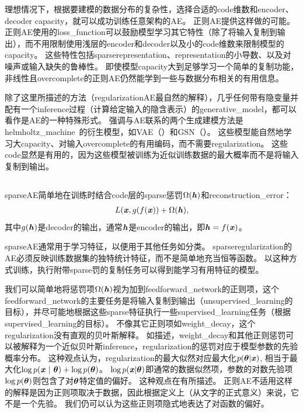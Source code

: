 理想情况下，根据要建模的数据分布的复杂性，选择合适的\gls{code}维数和\gls{encoder}、\gls{decoder}
\gls{capacity}，就可以成功训练任意架构的\gls{AE}。
正则\gls{AE}提供这样做的可能。
正则\gls{AE}使用的\gls{loss_function}可以鼓励模型学习其它特性（除了将输入复制到输出），而不用限制使用浅层的\gls{encoder}和\gls{decoder}以及小的\gls{code}维数来限制模型的\gls{capacity}。
这些特性包括\gls{sparse}\gls{representation}、\gls{representation}的小导数、以及对噪声或输入缺失的鲁棒性。
即使模型\gls{capacity}大到足够学习一个简单的复制功能，非线性且\gls{overcomplete}的正则\gls{AE}仍然能学到一些与数据分布相关的有用信息。


除了这里所描述的方法（\gls{regularization}\gls{AE}最自然的解释），几乎任何带有隐变量并配有一个\gls{inference}过程（计算给定输入的隐含表示）的\gls{generative_model}，都可以看作是\gls{AE}的一种特殊形式。
强调与\gls{AE}联系的两个生成建模方法是\gls{helmholtz_machine}~\citep{Hinton95}的衍生模型，如\gls{VAE}（）和\gls{GSN}（）。
这些模型能自然地学习大\gls{capacity}、对输入\gls{overcomplete}的有用编码，而不需要\gls{regularization}。
这些\gls{code}显然是有用的，因为这些模型被训练为近似训练数据的最大概率而不是将输入复制到输出。


\subsection{}
\label{sec:sparse_autoencoders}
\gls{sparse}\gls{AE}简单地在训练时结合\gls{code}层的\gls{sparse}惩罚$\Omega(\boldsymbol{\mathit{h}})$和\gls{reconstruction_error}：
\begin{align}
L(\boldsymbol{\mathit{x}}, g(f(\boldsymbol{\mathit{x}})) + \Omega(\boldsymbol{\mathit{h}}),
\end{align}
其中$g(\boldsymbol{\mathit{h}})$是\gls{decoder}的输出，通常$\boldsymbol{\mathit{h}}$是\gls{encoder}的输出，即$\boldsymbol{\mathit{h}} = f(\boldsymbol{\mathit{x}})$。


\gls{sparse}\gls{AE}通常用于学习特征，以便用于其他任务如分类。
\gls{sparse}\gls{regularization}的\gls{AE}必须反映训练数据集的独特统计特征，而不是简单地充当恒等函数。
以这种方式训练，执行附带\gls{sparse}罚的复制任务可以得到能学习有用特征的模型。


我们可以简单地将惩罚项$\Omega(\boldsymbol{\mathit{h}})$视为加到\gls{feedforward_network}的正则项，这个\gls{feedforward_network}的主要任务是将输入复制到输出（\gls{unsupervised_learning}的目标），并尽可能地根据这些\gls{sparse}特征执行一些\gls{supervised_learning}任务（根据\gls{supervised_learning}的目标）。
不像其它正则项如\gls{weight_decay}，这个\gls{regularization}没有直观的贝叶斯解释。
如描述，\gls{weight_decay}和其他正则惩罚可以被解释为一个近似贝叶斯\gls{inference}，\gls{regularization}的惩罚对应于模型参数的先验概率分布。
这种观点认为，\gls{regularization}的最大似然对应最大化$p(\boldsymbol{\theta} | \boldsymbol{\mathit{x}})$, 相当于最大化$\log p(\boldsymbol{\mathit{x}} ~|~ \boldsymbol{\theta}) + \log p(\boldsymbol{\theta})$。 $\log p(\boldsymbol{\mathit{x}} | \boldsymbol{\theta})$即通常的数据似然项，参数的对数先验项$\log p(\boldsymbol{\theta})$则包含了对$\boldsymbol{\theta}$特定值的偏好。
这种观点在有所描述。
正则\gls{AE}不适用这样的解释是因为正则项取决于数据，因此根据定义上（从文字的正式意义）来说，它不是一个先验。
我们仍可以认为这些正则项隐式地表达了对函数的偏好。

